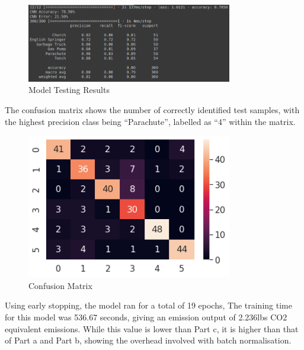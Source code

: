 \begin{figure}[H]
	\centering
	\includegraphics[width=0.8\textwidth]{images/q1/pd/q1pdresults}
	\caption{Model Testing Results}
	\label{fig:q1pdResults}
\end{figure}

The confusion matrix shows the number of correctly identified test samples, with
the highest precision class being ``Parachute'', labelled as ``4'' within the
matrix.

\begin{figure}[H]
	\centering
	\includegraphics[width=0.8\textwidth]{images/q1/pd/matrix}
	\caption{Confusion Matrix}
	\label{fig:q1pdMatrix}
\end{figure}

Using early stopping, the model ran for a total of 19 epochs, The training time
for this model was 536.67 seconds, giving an emission output of 2.236lbs CO2
equivalent emissions. While this value is lower than Part c, it is higher than
that of Part a and Part b, showing the overhead involved with batch
normalisation.
